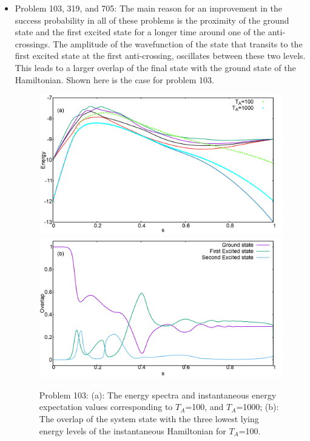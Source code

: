 \documentclass[../main.tex]{subfiles}
\begin{document}
\begin{appendices}
\begin{itemize}
\item Problem 103, 319, and 705: The main reason for an improvement in the success probability in all of these problems is the proximity of the ground state and the first excited state for a longer time around one of the anti-crossings. The amplitude of the wavefunction of the state that transits to the first excited state at the first anti-crossing, oscillates between these two levels. This leads to a larger overlap of the final state with the ground state of the Hamiltonian. Shown here is the case for problem 103.
\begin{figure}
\centering 
\includegraphics[scale=0.23]{103_A_g2.png}
\includegraphics[scale=0.23]{103_A_g2_Overlap.png}
\caption{Problem 103: (a): The energy spectra and instantaneous energy expectation values corresponding to $T_A$=100, and $T_A$=1000; (b): The overlap of the system state with the three lowest lying energy levels of the instantaneous Hamiltonian for $T_A$=100.}
\label{fig:ap6}
\end{figure}


\end{itemize}
\end{appendices}
\end{document}
